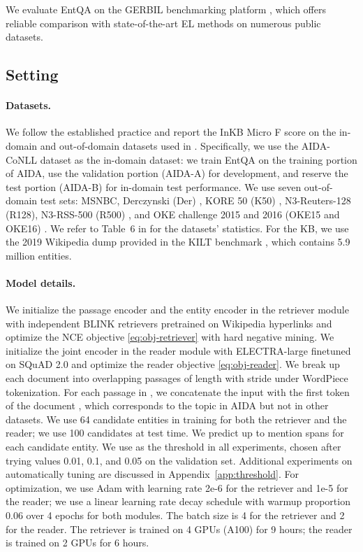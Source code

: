 \documentclass{article} \clearpage{}\usepackage{amsmath,amssymb,amsthm,bbm}
\theoremstyle{definition}
\begin{document}
We evaluate EntQA on the GERBIL benchmarking platform \citep{roder2018gerbil}, which offers reliable comparison with state-of-the-art EL methods on numerous public datasets.

\subsection{Setting}

\paragraph{Datasets.}
We follow the established practice and report the InKB Micro F score on the in-domain and out-of-domain datasets used in \cite{cao2021autoregressive}.
Specifically, we use the AIDA-CoNLL dataset \citep{hoffart2011robust} as the in-domain dataset:
we train EntQA on the training portion of AIDA, use the validation portion (AIDA-A) for development, and reserve the test portion (AIDA-B) for in-domain test performance.
We use seven out-of-domain test sets: MSNBC, Derczynski (Der) \citep{derczynski2015analysis}, KORE 50 (K50) \citep{hoffart2012kore}, N3-Reuters-128 (R128),
N3-RSS-500 (R500) \citep{roder2014n3}, and OKE challenge 2015 and 2016 (OKE15 and OKE16) \citep{nuzzolese2015open}.
We refer to Table~6 in \cite{kolitsas2018end} for the datasets' statistics.
For the KB, we use the 2019 Wikipedia dump provided in the KILT benchmark \citep{petroni-etal-2021-kilt}, which contains 5.9 million entities.

\paragraph{Model details.}
We initialize the passage encoder  and the entity encoder  in the retriever module
with independent BLINK retrievers pretrained on Wikipedia hyperlinks \citep{wu2020scalable}
and optimize the NCE objective \eqref{eq:obj-retriever} with hard negative mining.
We initialize the joint encoder  in the reader module with ELECTRA-large \citep{clark2019electra} finetuned on SQuAD 2.0 \citep{rajpurkar2018know}
and optimize the reader objective \eqref{eq:obj-reader}.
We break up each document  into overlapping passages of length  with stride  under WordPiece tokenization.
For each passage in , we concatenate the input with the first token of the document , which corresponds to the topic in AIDA but not in other datasets.
We use 64 candidate entities in training for both the retriever and the reader; we use 100 candidates at test time.
We predict up to  mention spans for each candidate entity.
We use  as the threshold in all experiments, chosen after trying values 0.01, 0.1, and 0.05 on the validation set.
Additional experiments on automatically tuning  are discussed in Appendix~\ref{app:threshold}.
For optimization, we use Adam \citep{adam14} with learning rate 2e-6 for the retriever and 1e-5 for the reader;
we use a linear learning rate decay schedule with warmup proportion 0.06 over 4 epochs for both modules.
The batch size is 4 for the retriever and 2 for the reader.
The retriever is trained on 4 GPUs (A100) for 9 hours; the reader is trained on 2 GPUs for 6 hours.
\end{document}
